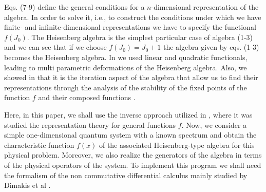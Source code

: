 \documentclass[a4paper,12pt]{article}
\begin{document}
Eqs. (7-9) define the general conditions for a 
$n$-dimensional representation of the algebra. In order to
solve it, i.e., to construct the conditions under which we have 
finite- and infinite-dimensional representations we have to specify 
the functional $f(J_0)$. The Heisenberg algebra
is the simplest particular case of algebra (1-3) and we
can see that if we choose 
$f(J_0) = J_0 + 1$ the algebra given by eqs. (1-3) becomes 
the Heisenberg algebra. In \cite{algebra2} we used  
linear and quadratic functionals, leading to multi parametric 
deformations of the Heisenberg algebra.  Also, we showed in \cite{algebra2}
that it is the 
iteration aspect of the algebra that  
allow us to find their representations through the 
analysis of the 
stability of the fixed points of the function $f$ and their
composed functions \cite{algebra1,algebra2}. 

Here, in this paper, we shall use the inverse approach 
utilized in \cite{algebra1,algebra2}, where it was 
studied the representation theory for general functions $f$. 
Now, we consider a simple one-dimensional quantum system
with a known spectrum and obtain the characteristic function
$f(x)$ of the associated Heisenberg-type algebra for
this physical problem. Moreover, we also realize the 
generators of the algebra in terms of the physical operators
of the system.
To implement this 
program we shall need the formalism of the non commutative 
differential calculus mainly studied by Dimakis et al 
\cite{dimakis1,dimakis2,dimakis3}. 
\end{document}
